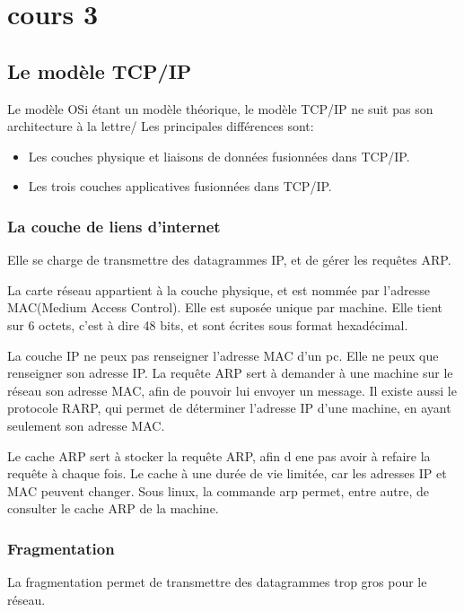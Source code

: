 \section{cours 3}
\subsection{Le modèle TCP/IP}
Le modèle OSi étant un modèle théorique, le modèle TCP/IP ne suit pas son architecture à la lettre/
Les principales différences sont:
\begin{itemize}
	\item Les couches physique et liaisons de données fusionnées dans TCP/IP.
	\item Les trois couches applicatives fusionnées dans TCP/IP.
\end{itemize}
\subsubsection{La couche de liens d'internet}
Elle se charge de transmettre des datagrammes IP, et de gérer les requêtes ARP.

La carte réseau appartient à la couche physique, et est nommée par l'adresse MAC(Medium Access Control).
Elle est suposée unique par machine. Elle tient sur 6 octets, c'est à dire 48 bits, et sont écrites sous format
hexadécimal.

La couche IP ne peux pas renseigner l'adresse MAC d'un pc. Elle ne peux que renseigner son adresse IP.
La requête ARP sert à demander à une machine sur le réseau son adresse MAC, afin de pouvoir lui envoyer un message.
Il existe aussi le protocole RARP, qui permet de déterminer l'adresse IP d'une machine, en ayant seulement son
adresse MAC.

Le cache ARP sert à stocker la requête ARP, afin d ene pas avoir à refaire la requête à chaque fois.
Le cache à une durée de vie limitée, car les adresses IP et MAC peuvent changer.
Sous linux, la commande arp permet, entre autre, de consulter le cache ARP de la machine.

\subsubsection{Fragmentation}
La fragmentation permet de transmettre des datagrammes trop gros pour le réseau.

